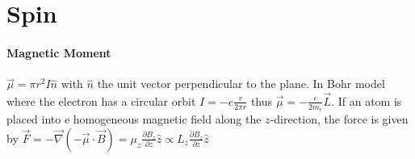 \section{Spin}

\paragraph{Magnetic Moment}
$\vec{\mu} = \pi r^2 I \hat{n}$ with $\hat{n}$ the unit vector perpendicular to
the plane. In Bohr model where the electron has a circular orbit
$I = - e \frac{v}{2 \pi r}$ thus $\vec{\mu} = - \frac{e}{2 m_e} \vec{L}$.
If an atom is placed into e homogeneous magnetic field along the $z$-direction,
the force is given by $\vec{F} = - \vec{\nabla} (-\vec{\mu} \cdot \vec{B}) = \mu_z
\frac{\partial B_z}{\partial z} \hat{z} \propto L_z \frac{\partial B_z}{\partial z} \hat{z}$

